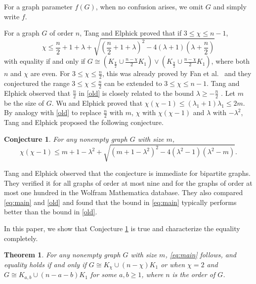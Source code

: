 \documentclass[12pt]{article}
\newtheorem{theorem}{Theorem}%
\newtheorem{conjecture}{Conjecture}
\begin{document}
For a graph parameter $f(G)$, when no confusion arises, we omit $G$ and simply write $f$. 

For a graph $G$ of order $n$, Tang and Elphick proved that if $3\le \chi\le n-1$, 
\begin{equation}\label{old}
\chi\le \frac{n}{2}+1+\lambda
 + \sqrt{\left(\frac{n}{2}+1+\lambda\right)^2-4(\lambda+1)\left(\lambda+\frac{n}{2}\right)}
\end{equation}
with equality if and only if $G\cong (K_{\frac{\chi}{2}}\cup \frac{n-\chi}{2}K_1)\vee (K_{\frac{\chi}{2}}\cup \frac{n-\chi}{2}K_1)$, where both $n$ and $\chi$ are even. For  $3\le \chi\le \frac{n}{2}$, this was already proved by Fan et al.~\cite{FYW} and they conjectured the range $3\le \chi\le \frac{n}{2}$ can be  extended to  $3\le \chi\le n-1$.  
Tang and Elphick observed that $\frac{n}{2}$ in \eqref{old} is closely related to the bound $\lambda\ge -\frac{n}{2}$ \cite{Con,Pow}. Let $m$ be the size of $G$. Wu and Elphick \cite{WuElphick} proved that
$\chi(\chi-1)\le (\lambda_1+1)\lambda_1\le 2m$. By analogy with \eqref{old} to replace $\frac{n}{2}$ with $m$, $\chi$ with $\chi(\chi-1)$ and $\lambda$ with $-\lambda^2$, Tang and Elphick \cite{TangElphick} proposed the following conjecture. 

\begin{conjecture} \label{con} \cite[Conjecture~8]{TangElphick}
For any nonempty graph $G$ with size $m$,
\begin{equation}\label{eq:main}
\chi(\chi-1) \le m+1-\lambda^2
 + \sqrt{(m+1-\lambda^2)^2-4(\lambda^2-1)(\lambda^2-m)}.
\end{equation}
\end{conjecture}

Tang and Elphick observed that the conjecture is immediate for bipartite graphs. They  verified it for all graphs of order at most nine and for the graphs of order at most one hundred in the Wolfram Mathematica database.
They also compared \eqref{eq:main} and \eqref{old} and found that the bound in \eqref{eq:main} typically performs better than the bound in \eqref{old}.


In this paper, we show that Conjecture \ref{con} is true and characterize the equality completely.

\begin{theorem}\label{X}
For any nonempty graph $G$ with size $m$, \eqref{eq:main} follows, and  
equality holds  if and only if $G\cong K_\chi\cup (n-\chi)K_1$ or when $\chi=2$ and $G\cong K_{a,b}\cup (n-a-b)K_1$ for some  $a,b\ge 1$, where $n$ is the order of $G$.
\end{theorem}
\end{document}
